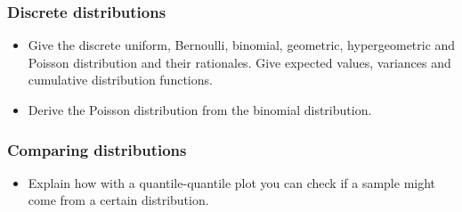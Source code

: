 \subsubsection*{Discrete distributions}
\begin{itemize}
    \item Give the discrete uniform, Bernoulli, binomial, geometric, hypergeometric and Poisson distribution and their rationales. Give expected values, variances and cumulative distribution functions.
    \answerboxL
    \item Derive the Poisson distribution from the binomial distribution.
    \answerboxL
\end{itemize}

\subsubsection*{Comparing distributions}
\begin{itemize}
    \item Explain how with a quantile-quantile plot you can check if a sample might come from a certain distribution.
    \answerboxM
\end{itemize}

